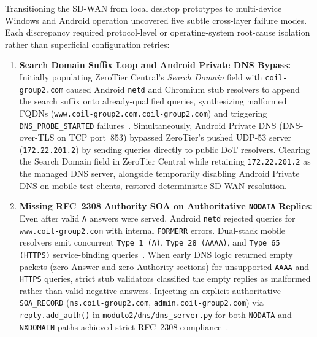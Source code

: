 Transitioning the SD-WAN from local desktop prototypes to multi-device Windows and Android operation uncovered five subtle cross-layer failure modes. Each discrepancy required protocol-level or operating-system root-cause isolation rather than superficial configuration retries:

\begin{enumerate}
    \item \textbf{Search Domain Suffix Loop and Android Private DNS Bypass:} Initially populating ZeroTier Central's \textit{Search Domain} field with \texttt{coil-group2.com} caused Android \texttt{netd} and Chromium stub resolvers to append the search suffix onto already-qualified queries, synthesizing malformed FQDNs (\nolinkurl{www.coil-group2.com.coil-group2.com}) and triggering \texttt{DNS\_PROBE\_STARTED} failures~\cite{rfc1034,rfc1035}. Simultaneously, Android Private DNS (DNS-over-TLS on TCP port~853) bypassed ZeroTier's pushed UDP-53 server (\texttt{172.22.201.2}) by sending queries directly to public DoT resolvers. Clearing the Search Domain field in ZeroTier Central while retaining \texttt{172.22.201.2} as the managed DNS server, alongside temporarily disabling Android Private DNS on mobile test clients, restored deterministic SD-WAN resolution.

    \item \textbf{Missing RFC~2308 Authority SOA on Authoritative \texttt{NODATA} Replies:} Even after valid \texttt{A} answers were served, Android \texttt{netd} rejected queries for \nolinkurl{www.coil-group2.com} with internal \texttt{FORMERR} errors. Dual-stack mobile resolvers emit concurrent \texttt{Type~1 (A)}, \texttt{Type~28 (AAAA)}, and \texttt{Type~65 (HTTPS)} service-binding queries~\cite{rfc1035}. When early DNS logic returned empty packets (zero Answer and zero Authority sections) for unsupported \texttt{AAAA} and \texttt{HTTPS} queries, strict stub validators classified the empty replies as malformed rather than valid negative answers. Injecting an explicit authoritative \texttt{SOA\_RECORD} (\texttt{ns.coil-group2.com}, \texttt{admin.coil-group2.com}) via \texttt{reply.add\_auth()} in \nolinkurl{modulo2/dns/dns_server.py} for both \texttt{NODATA} and \texttt{NXDOMAIN} paths achieved strict RFC~2308 compliance~\cite{rfc2308}.


\end{enumerate}
